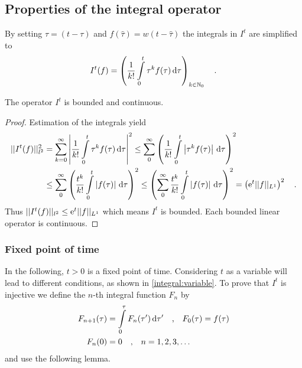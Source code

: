 \subsection{Properties of the integral operator}
By setting $\hat{\tau} = (t-\tau)
$ and $f(\hat{\tau}) = w(t-\hat{\tau})$ the integrals in $I^t$ are simplified to
\begin{equation}
I^t(f) = \left( \frac{1}{k!} \int\limits_0^t \tau^k f(\tau) \, \text{d}\tau 
\right)_{k\in\mathbb{N}_0} \quad .
\end{equation}

\begin{proposition}
The operator $I^t$ is bounded and continuous.
\end{proposition}
\begin{proof}
Estimation of the integrals yield
\begin{equation}
\begin{aligned}
|| I^t(f) ||_{l^2}^2 &= \sum\limits_{k=0}^\infty \left| \frac{1}{k!}
\int\limits_0^t  \tau^k f(\tau) \, \text{d} \tau \right|^2 
\leq \sum\limits_0^\infty \left( \frac{1}{k!}\int\limits_0^t 
\left| \tau^k f(\tau) \right| \, \text{d}\tau \right)^2 \\
&\leq \sum\limits_0^\infty \left( \frac{t^k}{k!}\int\limits_0^t 
\left|f(\tau) \right| \, \text{d}\tau \right)^2 
\leq \left( \sum\limits_0^\infty  \frac{t^k}{k!}\int\limits_0^t 
\left|f(\tau) \right| \, \text{d}\tau \right)^2 
= \left(\text{e}^t ||f||_{L^1} \right)^2 \quad .
\end{aligned}
\end{equation}
Thus $||I^t(f)||_{l^2} \leq \text{e}^t ||f||_{L^1}$ which means $I^t$ is 
bounded. Each bounded linear operator is 
continuous.
\end{proof}

\subsubsection{Fixed point of time}\label{integral:fixed}
In the following, $t>0$ is a fixed point of time. Considering $t$ as a variable will 
lead to different conditions, as shown in \ref{integral:variable}.
To prove that $I^t$ is injective we  
define the $n$-th integral function $F_n$ by
\begin{align}
F_{n+1}(\tau) &= \int\limits_0^\tau F_n(\tau') \,\text{d}\tau' \quad \text{,} \quad
F_0(\tau) = f(\tau) \\
F_n(0) &= 0 \quad \text{,} \quad n=1,2,3,\ldots	
\end{align}
and use the following lemma.

